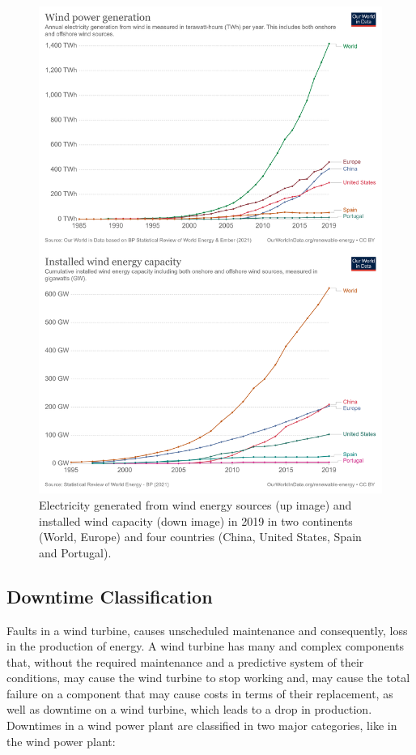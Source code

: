 \begin{figure}[htbp]
	\centering
	\includegraphics[width=\textwidth]{Chapters/Figures/background_fig6.PNG}
	\caption{Electricity generated from wind energy sources (up image) and  installed wind capacity (down image) in 2019 in two continents (World, Europe) and four countries (China, United States, Spain and Portugal). \cite{OLD_33_GENERAL} }
	\label{fig:Figuras_Tree_silhouettes-vectorial}
\end{figure}


\subsection{Downtime Classification} 
\label{sub:if_you_use_this_template} 

Faults in a wind turbine, causes unscheduled maintenance and consequently, loss in the production of energy. A wind turbine has many and complex components that, without the required maintenance and a predictive system of their conditions, may cause the wind turbine to stop working and, may cause the total failure on a component that may cause costs in terms of their replacement, as well as downtime on a wind turbine, which leads to a drop in production.
Downtimes in a wind power plant are classified in two major categories, like in the wind power plant:
 
